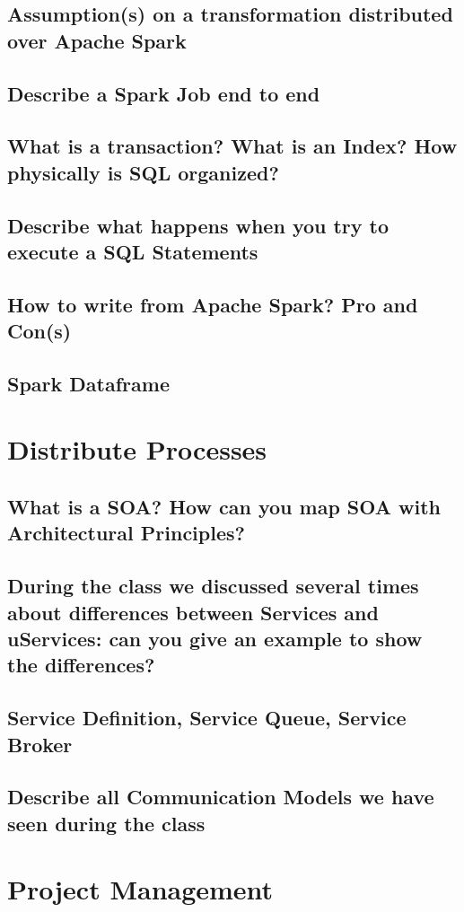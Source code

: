 \documentclass{article}
\begin{document}
\subsection{Assumption(s) on a transformation distributed over Apache Spark}
\subsection{Describe a Spark Job end to end}
\subsection{What is a transaction? What is an Index? How physically is SQL organized?}
\subsection{Describe what happens when you try to execute a SQL Statements}
\subsection{How to write from Apache Spark? Pro and Con(s)}
\subsection{Spark Dataframe}
\section{Distribute Processes}
\subsection{What is a SOA? How can you map SOA with Architectural Principles?}
\subsection{During the class we discussed several times about differences between Services and uServices: can you give an example to show the differences?}
\subsection{Service Definition, Service Queue, Service Broker}
\subsection{Describe all Communication Models we have seen during the class}
\section{Project Management}
\end{document}
